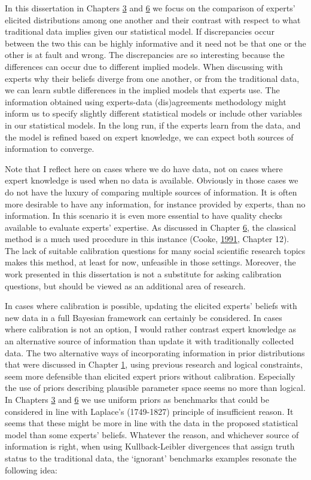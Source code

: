 \documentclass[openright,titlepage,12pt,a4paper]{book}
\begin{document}
In this dissertation in Chapters \protect\hyperlink{DAC1}{3} and \protect\hyperlink{elicitlgm}{6} we focus on the comparison of experts' elicited distributions among one another and their contrast with respect to what traditional data implies given our statistical model. If discrepancies occur between the two this can be highly informative and it need not be that one or the other is at fault and wrong. The discrepancies are so interesting because the differences can occur due to different implied models. When discussing with experts why their beliefs diverge from one another, or from the traditional data, we can learn subtle differences in the implied models that experts use. The information obtained using experts-data (dis)agreements methodology might inform us to specify slightly different statistical models or include other variables in our statistical models. In the long run, if the experts learn from the data, and the model is refined based on expert knowledge, we can expect both sources of information to converge.

Note that I reflect here on cases where we do have data, not on cases where expert knowledge is used when no data is available. Obviously in those cases we do not have the luxury of comparing multiple sources of information. It is often more desirable to have any information, for instance provided by experts, than no information. In this scenario it is even more essential to have quality checks available to evaluate experts' expertise. As discussed in Chapter \protect\hyperlink{elicitlgm}{6}, the classical method is a much used procedure in this instance (Cooke, \protect\hyperlink{ref-cooke_experts_1991}{1991}, Chapter 12). The lack of suitable calibration questions for many social scientific research topics makes this method, at least for now, unfeasible in those settings. Moreover, the work presented in this dissertation is not a substitute for asking calibration questions, but should be viewed as an additional area of research.

In cases where calibration is possible, updating the elicited experts' beliefs with new data in a full Bayesian framework can certainly be considered. In cases where calibration is not an option, I would rather contrast expert knowledge as an alternative source of information than update it with traditionally collected data. The two alternative ways of incorporating information in prior distributions that were discussed in Chapter \protect\hyperlink{introduction}{1}, using previous research and logical constraints, seem more defensible than elicited expert priors without calibration. Especially the use of priors describing plausible parameter space seems no more than logical. In Chapters \protect\hyperlink{DAC1}{3} and \protect\hyperlink{elicitlgm}{6} we use uniform priors as benchmarks that could be considered in line with Laplace's (1749-1827) principle of insufficient reason. It seems that these might be more in line with the data in the proposed statistical model than some experts' beliefs. Whatever the reason, and whichever source of information is right, when using Kullback-Leibler divergences that assign truth status to the traditional data, the `ignorant' benchmarks examples resonate the following idea:
\end{document}
